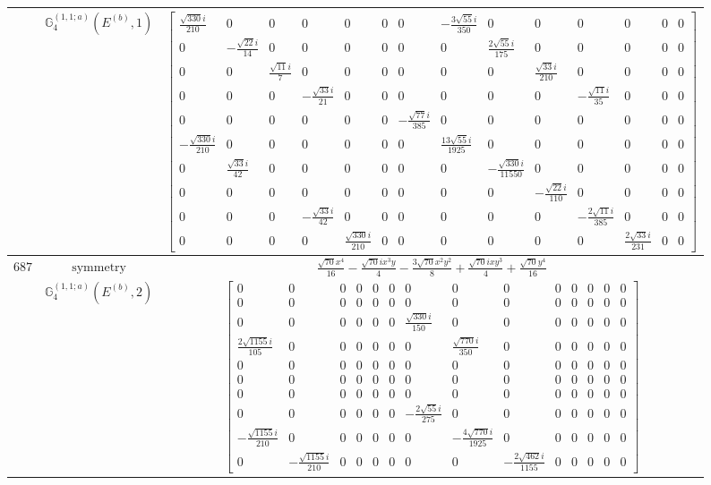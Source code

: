 \documentclass[fleqn,8pt,landscape]{jsarticle}
\begin{document}
\begin{longtable}{ccc}
$  $ & $ \mathbb{G}_{4}^{(1,1;a)}(E^{(b)},1) $ & $ \begin{bmatrix} \frac{\sqrt{330} i}{210} & 0 & 0 & 0 & 0 & 0 & 0 & - \frac{3 \sqrt{55} i}{350} & 0 & 0 & 0 & 0 & 0 & 0 \\ 0 & - \frac{\sqrt{22} i}{14} & 0 & 0 & 0 & 0 & 0 & 0 & \frac{2 \sqrt{55} i}{175} & 0 & 0 & 0 & 0 & 0 \\ 0 & 0 & \frac{\sqrt{11} i}{7} & 0 & 0 & 0 & 0 & 0 & 0 & \frac{\sqrt{33} i}{210} & 0 & 0 & 0 & 0 \\ 0 & 0 & 0 & - \frac{\sqrt{33} i}{21} & 0 & 0 & 0 & 0 & 0 & 0 & - \frac{\sqrt{11} i}{35} & 0 & 0 & 0 \\ 0 & 0 & 0 & 0 & 0 & 0 & - \frac{\sqrt{77} i}{385} & 0 & 0 & 0 & 0 & 0 & 0 & 0 \\ - \frac{\sqrt{330} i}{210} & 0 & 0 & 0 & 0 & 0 & 0 & \frac{13 \sqrt{55} i}{1925} & 0 & 0 & 0 & 0 & 0 & 0 \\ 0 & \frac{\sqrt{33} i}{42} & 0 & 0 & 0 & 0 & 0 & 0 & - \frac{\sqrt{330} i}{11550} & 0 & 0 & 0 & 0 & 0 \\ 0 & 0 & 0 & 0 & 0 & 0 & 0 & 0 & 0 & - \frac{\sqrt{22} i}{110} & 0 & 0 & 0 & 0 \\ 0 & 0 & 0 & - \frac{\sqrt{33} i}{42} & 0 & 0 & 0 & 0 & 0 & 0 & - \frac{2 \sqrt{11} i}{385} & 0 & 0 & 0 \\ 0 & 0 & 0 & 0 & \frac{\sqrt{330} i}{210} & 0 & 0 & 0 & 0 & 0 & 0 & \frac{2 \sqrt{33} i}{231} & 0 & 0 \end{bmatrix} $ \\ \hline
$ 687 $ & $ \text{symmetry} $ & $ \frac{\sqrt{70} x^{4}}{16} - \frac{\sqrt{70} i x^{3} y}{4} - \frac{3 \sqrt{70} x^{2} y^{2}}{8} + \frac{\sqrt{70} i x y^{3}}{4} + \frac{\sqrt{70} y^{4}}{16} $ \\
$  $ & $ \mathbb{G}_{4}^{(1,1;a)}(E^{(b)},2) $ & $ \begin{bmatrix} 0 & 0 & 0 & 0 & 0 & 0 & 0 & 0 & 0 & 0 & 0 & 0 & 0 & 0 \\ 0 & 0 & 0 & 0 & 0 & 0 & 0 & 0 & 0 & 0 & 0 & 0 & 0 & 0 \\ 0 & 0 & 0 & 0 & 0 & 0 & \frac{\sqrt{330} i}{150} & 0 & 0 & 0 & 0 & 0 & 0 & 0 \\ \frac{2 \sqrt{1155} i}{105} & 0 & 0 & 0 & 0 & 0 & 0 & \frac{\sqrt{770} i}{350} & 0 & 0 & 0 & 0 & 0 & 0 \\ 0 & 0 & 0 & 0 & 0 & 0 & 0 & 0 & 0 & 0 & 0 & 0 & 0 & 0 \\ 0 & 0 & 0 & 0 & 0 & 0 & 0 & 0 & 0 & 0 & 0 & 0 & 0 & 0 \\ 0 & 0 & 0 & 0 & 0 & 0 & 0 & 0 & 0 & 0 & 0 & 0 & 0 & 0 \\ 0 & 0 & 0 & 0 & 0 & 0 & - \frac{2 \sqrt{55} i}{275} & 0 & 0 & 0 & 0 & 0 & 0 & 0 \\ - \frac{\sqrt{1155} i}{210} & 0 & 0 & 0 & 0 & 0 & 0 & - \frac{4 \sqrt{770} i}{1925} & 0 & 0 & 0 & 0 & 0 & 0 \\ 0 & - \frac{\sqrt{1155} i}{210} & 0 & 0 & 0 & 0 & 0 & 0 & - \frac{2 \sqrt{462} i}{1155} & 0 & 0 & 0 & 0 & 0 \end{bmatrix} $ \\ \hline

\end{longtable}
\end{document}
